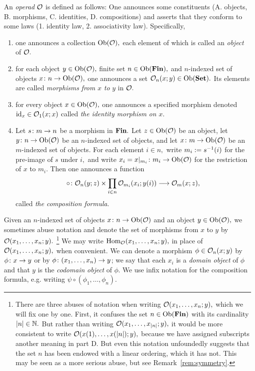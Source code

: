 \documentclass[CT4S-EN-RU]{subfiles}
\begin{document}
\begin{blockRUS}
\end{blockRUS}

\begin{definitionENG}\label{def:operad}
An {\em operad} $\mathcal{O}$ is defined as follows: One announces some constituents (A. objects, B. morphisms, C. identities, D. compositions) and asserts that they conform to some laws (1. identity law, 2. associativity law). Specifically, 
\begin{enumerate}[\hsp A.]
\item one announces a collection $\textnormal{Ob}(\mathcal{O}),$ each element of which is called an {\em object} of $\mathcal{O}.$
\item for each object $y\in\textnormal{Ob}(\mathcal{O}),$ finite set $n\in\textnormal{Ob}({\mathbf{Fin}}),$ and $n$-indexed set of objects $x\colon n\rightarrow\textnormal{Ob}(\mathcal{O}),$ one announces a set $\mathcal{O}_n(x;y)\in\textnormal{Ob}({\mathbf{Set}}).$ Its elements are called {\em morphisms from $x$ to $y$} in $\mathcal{O}.$ 
\item for every object $x\in\textnormal{Ob}(\mathcal{O}),$ one announces a specified morphism denoted $\textnormal{id}_x\in\mathcal{O}_1(x;x)$ called {\em the identity morphism on $x$}.
\item Let $s\colon m\rightarrow n$ be a morphism in ${\mathbf{Fin}}.$ Let $z\in\textnormal{Ob}(\mathcal{O})$ be an object, let $y\colon n\rightarrow\textnormal{Ob}(\mathcal{O})$ be an $n$-indexed set of objects, and let $x\colon m\rightarrow\textnormal{Ob}(\mathcal{O})$ be an $m$-indexed set of objects. For each element $i\in n,$ write $m_i:=s^\m1(i)$ for the pre-image of $s$ under $i,$ and write $x_i=x|_{m_i}\colon m_i\rightarrow\textnormal{Ob}(\mathcal{O})$ for the restriction of $x$ to $m_i.$ Then one announces a function 
\begin{align}\label{dia:composition formula}
\circ\colon\mathcal{O}_n(y;z)\times\prod_{i\in n}\mathcal{O}_{m_i}(x_i;y(i))\longrightarrow\mathcal{O}_{m}(x;z),
\end{align} 
called {\em the composition formula}.
\end{enumerate}
Given an $n$-indexed set of objects $x\colon n\rightarrow\textnormal{Ob}(\mathcal{O})$ and an object $y\in\textnormal{Ob}(\mathcal{O}),$ we sometimes abuse notation and denote the set of morphisms from $x$ to $y$ by $\mathcal{O}(x_1,\ldots,x_n;y).$
\footnote{There are three abuses of notation when writing $\mathcal{O}(x_1,\ldots,x_n;y),$ which we will fix one by one. First, it confuses the set $n\in\textnormal{Ob}({\mathbf{Fin}})$ with its cardinality $|n|\in{\mathbb N}.$ But rather than writing $\mathcal{O}(x_1,\ldots,x_{|n|};y),$ it would be more consistent to write $\mathcal{O}(x(1),\ldots,x(|n|);y),$ because we have assigned subscripts another meaning in part D. But even this notation unfoundedly suggests that the set $n$ has been endowed with a linear ordering, which it has not. This may be seen as a more serious abuse, but see Remark~\ref{rem:symmetry}.}
We may write $\textnormal{Hom}_\mathcal{O}(x_1,\ldots,x_n;y),$ in place of $\mathcal{O}(x_1,\ldots,x_n;y),$ when convenient. We can denote a morphism $\phi\in\mathcal{O}_n(x;y)$ by $\phi\colon x\rightarrow y$ or by $\phi\colon (x_1,\ldots,x_n)\rightarrow y$; we say that each $x_i$ is a {\em domain object} of $\phi$ and that $y$ is the {\em codomain object} of $\phi.$ We use infix notation for the composition formula, e.g. writing $\psi\circ(\phi_1,\ldots,\phi_n).$


\end{definitionENG}
\end{document}
